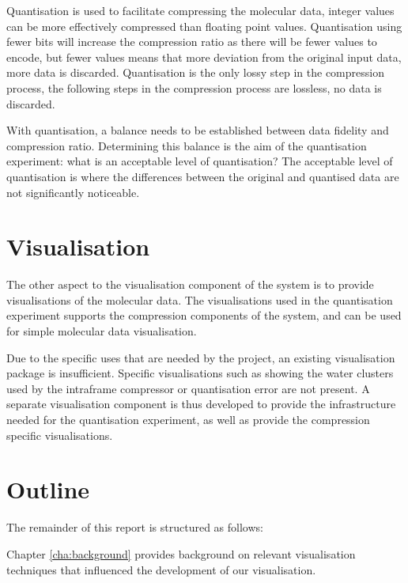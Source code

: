 Quantisation is used to facilitate compressing the molecular data, integer
values can be more effectively compressed than floating point values.
Quantisation using fewer bits will increase the compression ratio as there will
be fewer values to encode, but fewer values means that more deviation from the
original input data, more data is discarded. Quantisation is the only lossy
step in the compression process, the following steps in the compression process
are lossless, no data is discarded.

With quantisation, a balance needs to be established between data fidelity and
compression ratio. Determining this balance is the aim of the quantisation
experiment: what is an acceptable level of quantisation? The acceptable level
of quantisation is where the differences between the original and quantised
data are not significantly noticeable.


\section{Visualisation}
\label{sec:introduction_visualisation}

The other aspect to the visualisation component of the system is to provide
visualisations of the molecular data. The visualisations used in the
quantisation experiment supports the compression components of the system, and
can be used for simple molecular data visualisation.

Due to the specific uses that are needed by the project, an existing
visualisation package is insufficient. Specific visualisations such as showing
the water clusters used by the intraframe compressor or quantisation error are
not present. A separate visualisation component is thus developed to provide
the infrastructure needed for the quantisation experiment, as well as provide
the compression specific visualisations.


\section{Outline}
\label{sec:introduction_outline}

The remainder of this report is structured as follows:

Chapter \ref{cha:background} provides background on relevant visualisation
techniques that influenced the development of our visualisation.

